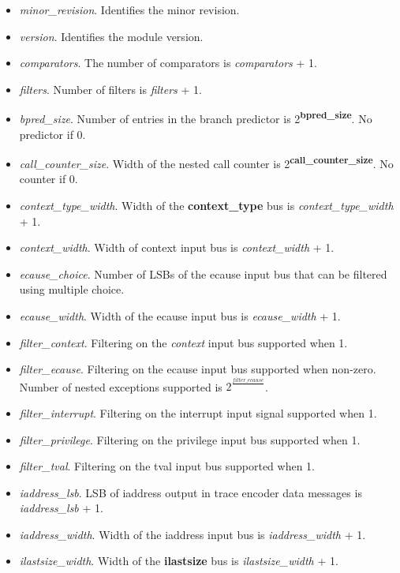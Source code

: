 \begin{itemize}
    \item \textit{minor\_revision}. Identifies the minor revision.
    \item \textit{version}. Identifies the module version.
    \item \textit{comparators}. The number of comparators is \textit{comparators} + 1.
    \item \textit{filters}. Number of filters is \textit{filters} + 1.
    \item \textit{bpred\_size}. Number of entries in the branch predictor is 2\textsuperscript{\textbf{bpred\_size}}.  No predictor if 0.
    \item \textit{call\_counter\_size}. Width of the nested call counter is 2\textsuperscript{\textbf{call\_counter\_size}}.  No counter if 0.
    \item \textit{context\_type\_width}. Width of the \textbf{context\_type} bus is \textit{context\_type\_width} + 1.
    \item \textit{context\_width}. Width of context input bus is \textit{context\_width} + 1.
    \item \textit{ecause\_choice}. Number of LSBs of the ecause input bus that can be filtered using multiple choice.
    \item \textit{ecause\_width}. Width of the ecause input bus is \textit{ecause\_width} + 1.
    \item \textit{filter\_context}. Filtering on the \textit{context} input bus supported when 1.
    \item \textit{filter\_ecause}. Filtering on the ecause input bus supported when non-zero.  Number of nested exceptions supported is $2^\frac{\textit {filter\_ecause}}{}$.
    \item \textit{filter\_interrupt}. Filtering on the interrupt input signal supported when 1.
    \item \textit{filter\_privilege}. Filtering on the privilege input bus supported when 1.
    \item \textit{filter\_tval}. Filtering on the tval input bus supported when 1.
    \item \textit{iaddress\_lsb}. LSB of iaddress output in trace encoder data messages is \textit{iaddress\_lsb} + 1.
    \item \textit{iaddress\_width}. Width of the iaddress input bus is \textit{iaddress\_width} + 1.
    \item \textit{ilastsize\_width}. Width of the \textbf{ilastsize} bus is \textit{ilastsize\_width} + 1.

\end{itemize}
